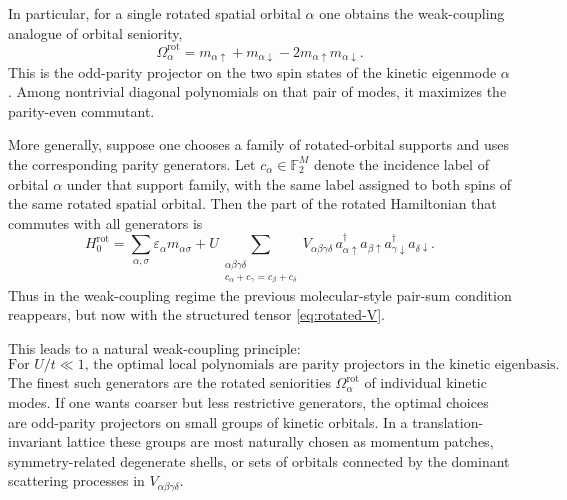\documentclass[11pt]{article}
\theoremstyle{definition}
\theoremstyle{remark}
\begin{document}
In particular, for a single rotated spatial orbital $\alpha$ one obtains the weak-coupling analogue of orbital seniority,
\begin{equation}
  \Omega_{\alpha}^{\mathrm{rot}}
  =m_{\alpha\uparrow}+m_{\alpha\downarrow}-2m_{\alpha\uparrow}m_{\alpha\downarrow}.
\end{equation}
This is the odd-parity projector on the two spin states of the kinetic eigenmode $\alpha$. Among nontrivial diagonal polynomials on that pair of modes, it maximizes the parity-even commutant.

More generally, suppose one chooses a family of rotated-orbital supports and uses the corresponding parity generators. Let $c_\alpha\in \mathbb F_2^M$ denote the incidence label of orbital $\alpha$ under that support family, with the same label assigned to both spins of the same rotated spatial orbital. Then the part of the rotated Hamiltonian that commutes with all generators is
\begin{equation}
  H_0^{\mathrm{rot}}
  =
  \sum_{\alpha,\sigma}\varepsilon_\alpha m_{\alpha\sigma}
  +U\sum_{\substack{\alpha\beta\gamma\delta\\ c_\alpha+c_\gamma=c_\beta+c_\delta}}
  V_{\alpha\beta\gamma\delta}
  \,a_{\alpha\uparrow}^\dagger a_{\beta\uparrow}
  a_{\gamma\downarrow}^\dagger a_{\delta\downarrow}.
  \label{eq:hubbard-rot-H0}
\end{equation}
Thus in the weak-coupling regime the previous molecular-style pair-sum condition reappears, but now with the structured tensor \eqref{eq:rotated-V}.

This leads to a natural weak-coupling principle:
\begin{equation}
  \boxed{\text{For }U/t\ll 1, \,\text{the optimal local polynomials are parity projectors in the kinetic eigenbasis.}}
\end{equation}
The finest such generators are the rotated seniorities $\Omega_\alpha^{\mathrm{rot}}$ of individual kinetic modes. If one wants coarser but less restrictive generators, the optimal choices are odd-parity projectors on small groups of kinetic orbitals. In a translation-invariant lattice these groups are most naturally chosen as momentum patches, symmetry-related degenerate shells, or sets of orbitals connected by the dominant scattering processes in $V_{\alpha\beta\gamma\delta}$.
\end{document}
